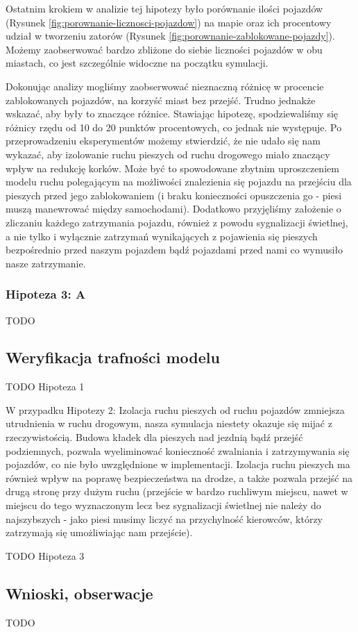 \documentclass{article}
\begin{document}
Ostatnim krokiem w analizie tej hipotezy było porównanie ilości pojazdów (Rysunek \ref{fig:porownanie-licznosci-pojazdow}) na mapie oraz ich procentowy udział w tworzeniu zatorów (Rysunek \ref{fig:porownanie-zablokowane-pojazdy}). Możemy zaobserwować bardzo zbliżone do siebie liczności pojazdów w obu miastach, co jest szczególnie widoczne na początku symulacji.

Dokonując analizy mogliśmy zaobserwować nieznaczną różnicę w procencie zablokowanych pojazdów, na korzyść miast bez przejść. Trudno jednakże wskazać, aby były to znaczące różnice. Stawiając hipotezę, spodziewaliśmy się różnicy rzędu od 10 do 20 punktów procentowych, co jednak nie występuje.
Po przeprowadzeniu eksperymentów możemy stwierdzić, że nie udało się nam wykazać, aby izolowanie ruchu pieszych od ruchu drogowego miało znaczący wpływ na redukcję korków. Może być to spowodowane zbytnim uproszczeniem modelu ruchu polegającym na możliwości znalezienia się pojazdu na przejściu dla pieszych przed jego zablokowaniem (i braku konieczności opuszczenia go - piesi muszą manewrować między samochodami). Dodatkowo przyjęliśmy założenie o zliczaniu każdego zatrzymania pojazdu, również z powodu sygnalizacji świetlnej, a nie tylko i wyłącznie zatrzymań wynikających z pojawienia się pieszych bezpośrednio przed naszym pojazdem bądź pojazdami przed nami co wymusiło nasze zatrzymanie.

\subsubsection{Hipoteza 3: A}
TODO

\subsection{Weryfikacja trafności modelu}
\label{subsection:weryfikacja-trafnosci-modelu}
TODO Hipoteza 1

W przypadku Hipotezy 2: Izolacja ruchu pieszych od ruchu pojazdów zmniejsza utrudnienia w ruchu drogowym, nasza symulacja niestety okazuje się mijać z rzeczywistością. Budowa kładek dla pieszych nad jezdnią bądź przejść podziemnych, pozwala wyeliminować konieczność zwalniania i zatrzymywania się pojazdów, co nie było uwzględnione w implementacji. Izolacja ruchu pieszych ma również wpływ na poprawę bezpieczeństwa na drodze, a także pozwala przejść na drugą stronę przy dużym ruchu (przejście w bardzo ruchliwym miejscu, nawet w miejscu do tego wyznaczonym lecz bez sygnalizacji świetlnej nie należy do najszybszych - jako piesi musimy liczyć na przychylność kierowców, którzy zatrzymają się umożliwiając nam przejście).

TODO Hipoteza 3

\subsection{Wnioski, obserwacje}
\label{subsection:wnioski}
TODO
\end{document}
